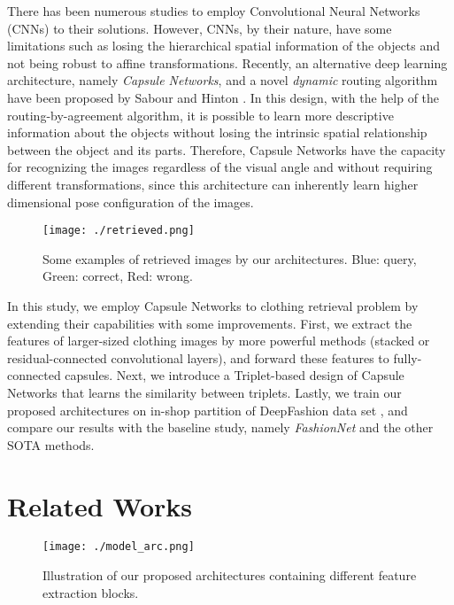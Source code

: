 \documentclass[10pt,twocolumn,letterpaper]{article}
\begin{document}
There has been numerous studies \cite{wtbi, darn, deepfashion, weakly-anno, vam, hdc, bier, htl, abe} to employ Convolutional Neural Networks (CNNs) to their solutions. However, CNNs, by their nature, have some limitations such as losing the hierarchical spatial information of the objects and not being robust to affine transformations. Recently, an alternative deep learning architecture, namely \textit{Capsule Networks}, and a novel \textit{dynamic} routing algorithm have been proposed by Sabour and Hinton \etal \cite{capsule}. In this design, with the help of the routing-by-agreement algorithm, it is possible to learn more descriptive information about the objects without losing the intrinsic spatial relationship between the object and its parts. Therefore, Capsule Networks have the capacity for recognizing the images regardless of the visual angle and without requiring different transformations, since this architecture can inherently learn higher dimensional pose configuration of the images. 

\begin{figure}[t]
\begin{center}
\texttt{[image: ./retrieved.png]}
\end{center}
\caption{Some examples of retrieved images by our architectures. Blue: query, Green: correct, Red: wrong.}
\label{fig:datasetQuery}
\end{figure}

In this study, we employ Capsule Networks to clothing retrieval problem by extending their capabilities with some improvements. First, we extract the features of larger-sized clothing images by more powerful methods (\ie stacked or residual-connected convolutional layers), and forward these features to fully-connected capsules. Next, we introduce a Triplet-based design of Capsule Networks that learns the similarity between triplets. Lastly, we train our proposed architectures on in-shop partition of DeepFashion data set \cite{deepfashion}, and compare our results with the baseline study, namely \textit{FashionNet} \cite{deepfashion} and the other SOTA methods.

\section{Related Works}

\begin{figure*}[ht!]
\begin{center}
\texttt{[image: ./model\_arc.png]}
\end{center}
\caption{Illustration of our proposed architectures containing different feature extraction blocks.}
\label{fig:architecture}
\end{figure*}
\end{document}
